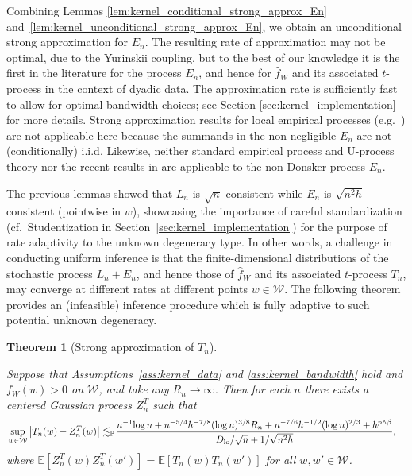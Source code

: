 \documentclass[11pt,lof]{puthesis}
\renewcommand{\P}{\ensuremath{\mathbb{P}}}
\newcommand{\E}{\ensuremath{\mathbb{E}}}
\newcommand{\cW}{\ensuremath{\mathcal{W}}}
\newcommand{\Dl}{\ensuremath{D_{\textup{lo}}}}
\theoremstyle{break}
\newtheorem{theorem}{Theorem}[section]
\theoremstyle{proof}
\begin{document}
Combining Lemmas \ref{lem:kernel_conditional_strong_approx_En}
and~\ref{lem:kernel_unconditional_strong_approx_En}, we obtain
an unconditional strong
approximation for $E_n$. The resulting rate of approximation may not be
optimal, due to the Yurinskii coupling, but to the best of our knowledge it is
the first in the literature for the process $E_n$, and hence for $\hat{f}_W$
and its associated $t$-process in the context of dyadic data. The approximation
rate is sufficiently fast to allow for optimal bandwidth choices; see Section
\ref{sec:kernel_implementation} for more details. Strong approximation results
for
local empirical processes (e.g.\ \citealp{gine2010confidence}) are not
applicable here because the summands in the non-negligible $E_n$ are not
(conditionally) i.i.d. Likewise, neither standard empirical process and
U-process theory \citep{van1996weak,gine2021mathematical} nor the recent
results in \citet{davezies2021exchangeable} are applicable to the non-Donsker
process $E_n$.

The previous lemmas showed that $L_n$ is $\sqrt{n}$-consistent while $E_n$ is
$\sqrt{n^2h}$-consistent (pointwise in $w$), showcasing the importance of
careful standardization (cf.\ Studentization in
Section~\ref{sec:kernel_implementation}) for the purpose of rate adaptivity to
the
unknown degeneracy type. In other words, a challenge in conducting uniform
inference is that the finite-dimensional distributions of the stochastic
process $L_n+E_n$, and hence those of $\hat{f}_W$ and its associated
$t$-process $T_n$, may converge at different rates at different points
$w\in\cW$. The following theorem provides an (infeasible) inference procedure
which is fully adaptive to such potential unknown degeneracy.

\begin{theorem}[Strong approximation of $T_n$]
  \label{thm:kernel_strong_approx_Tn}

  Suppose that Assumptions~\ref{ass:kernel_data} and \ref{ass:kernel_bandwidth}
  hold and $f_W(w) > 0$ on $\cW$, and take any $R_n \to \infty$. Then for each
  $n$ there exists a centered Gaussian process $Z_n^{T}$ such that
  \begin{align*}
    &\sup_{w \in \cW} \left| T_n(w) - Z_n^{T}(w) \right|
    \lesssim_\P \!
    \frac{
      n^{-1} \! \log n
      + n^{-5/4} h^{-7/8} (\log n)^{3/8} R_n
      + n^{-7/6} h^{-1/2} (\log n)^{2/3}
    + h^{p\wedge\beta}}
    {\Dl/\sqrt{n} + 1/\sqrt{n^2h}},
  \end{align*}
  where $\E[Z_n^T(w)Z_n^T(w')] = \E[T_n(w)T_n(w')]$ for all $w,w' \in \cW$.
\end{theorem}
\end{document}

